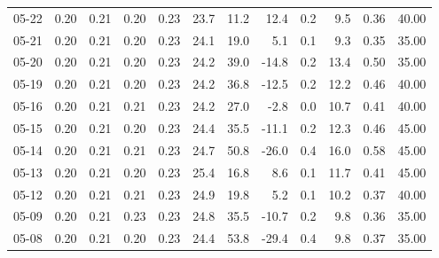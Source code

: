 \begin{threeparttable}
{\begin{tabular}{lrrrrrrrrrrr}
  05-22 &          0.20 &          0.21 &          0.20 &        0.23 &                23.7 &                11.2 &       12.4 &                 0.2 &              9.5 &            0.36 &                  40.00 \\
  05-21 &          0.20 &          0.21 &          0.20 &        0.23 &                24.1 &                19.0 &        5.1 &                 0.1 &              9.3 &            0.35 &                  35.00 \\
  05-20 &          0.20 &          0.21 &          0.20 &        0.23 &                24.2 &                39.0 &      -14.8 &                 0.2 &             13.4 &            0.50 &                  35.00 \\
  05-19 &          0.20 &          0.21 &          0.20 &        0.23 &                24.2 &                36.8 &      -12.5 &                 0.2 &             12.2 &            0.46 &                  40.00 \\
  05-16 &          0.20 &          0.21 &          0.21 &        0.23 &                24.2 &                27.0 &       -2.8 &                 0.0 &             10.7 &            0.41 &                  40.00 \\
  05-15 &          0.20 &          0.21 &          0.20 &        0.23 &                24.4 &                35.5 &      -11.1 &                 0.2 &             12.3 &            0.46 &                  45.00 \\
  05-14 &          0.20 &          0.21 &          0.21 &        0.23 &                24.7 &                50.8 &      -26.0 &                 0.4 &             16.0 &            0.58 &                  45.00 \\
  05-13 &          0.20 &          0.21 &          0.20 &        0.23 &                25.4 &                16.8 &        8.6 &                 0.1 &             11.7 &            0.41 &                  45.00 \\
  05-12 &          0.20 &          0.21 &          0.21 &        0.23 &                24.9 &                19.8 &        5.2 &                 0.1 &             10.2 &            0.37 &                  40.00 \\
  05-09 &          0.20 &          0.21 &          0.23 &        0.23 &                24.8 &                35.5 &      -10.7 &                 0.2 &              9.8 &            0.36 &                  35.00 \\
  05-08 &          0.20 &          0.21 &          0.20 &        0.23 &                24.4 &                53.8 &      -29.4 &                 0.4 &              9.8 &            0.37 &                  35.00 \\

\end{tabular}}
\end{threeparttable}
